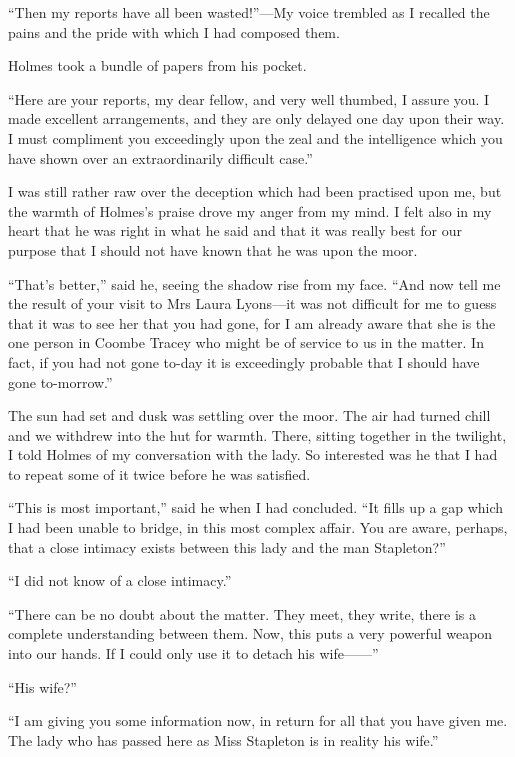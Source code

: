 \documentclass[paper=a5,BCOR=7mm,twoside,DIV=calc,12pt,usegeometry,openany,chapterprefix,endperiod,headings=big]{scrbook} %
\begin{document}
\enquote{Then my reports have all been wasted!}---My voice trembled as I recalled the pains and the pride with which I had composed them.

Holmes took a bundle of papers from his pocket.

\enquote{Here are your reports, my dear fellow, and very well thumbed, I assure you. I made excellent arrangements, and they are only delayed one day upon their way. I must compliment you exceedingly upon the zeal and the intelligence which you have shown over an extraordinarily difficult case.}

I was still rather raw over the deception which had been practised upon me, but the warmth of Holmes's praise drove my anger from my mind. I felt also in my heart that he was right in what he said and that it was really best for our purpose that I should not have known that he was upon the moor.

\enquote{That's better,} said he, seeing the shadow rise from my face. \enquote{And now tell me the result of your visit to Mrs Laura Lyons---it was not difficult for me to guess that it was to see her that you had gone, for I am already aware that she is the one person in Coombe Tracey who might be of service to us in the matter. In fact, if you had not gone to-day it is exceedingly probable that I should have gone to-morrow.}

The sun had set and dusk was settling over the moor. The air had turned chill and we withdrew into the hut for warmth. There, sitting together in the twilight, I told Holmes of my conversation with the lady. So interested was he that I had to repeat some of it twice before he was satisfied.

\enquote{This is most important,} said he when I had concluded. \enquote{It fills up a gap which I had been unable to bridge, in this most complex affair. You are aware, perhaps, that a close intimacy exists between this lady and the man Stapleton?}

\enquote{I did not know of a close intimacy.}

\enquote{There can be no doubt about the matter. They meet, they write, there is a complete understanding between them. Now, this puts a very powerful weapon into our hands. If I could only use it to detach his wife------}

\enquote{His wife?}

\enquote{I am giving you some information now, in return for all that you have given me. The lady who has passed here as Miss Stapleton is in reality his wife.}
\end{document}
